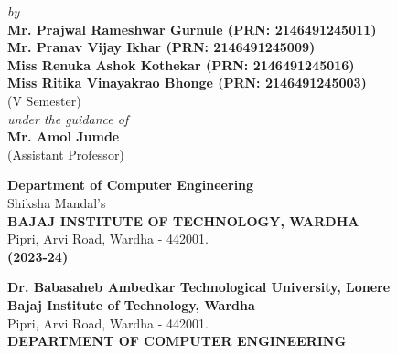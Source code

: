 \documentclass[a4paper, 12pt]{report}
\begin{document}
\begin{frontmatter}
\begin{titlepage}
\begin{center}
	\textit{by}\\[0.3cm]
	\textbf{Mr. Prajwal Rameshwar Gurnule (PRN: 2146491245011)}\\[0.25cm]
	\textbf{Mr. Pranav Vijay Ikhar (PRN: 2146491245009)}\\[0.25cm]
	\textbf{Miss Renuka Ashok Kothekar (PRN: 2146491245016)}\\[0.25cm]
	\textbf{Miss Ritika Vinayakrao Bhonge (PRN: 2146491245003)}\\[0.25cm]
	(V Semester)
	\\[0.5cm]	
	
	\textit{under the guidance of}\\[0.25cm]
	\textbf{Mr. Amol Jumde}\\[0.25cm]	
	(Assistant Professor)\\[0.5cm]
	\vspace{0.2cm}
	
	\textup{\textbf{\large Department of Computer Engineering}\\[0.1cm]
		Shiksha Mandal's\\
		[0.1cm]
		\textbf{BAJAJ INSTITUTE OF TECHNOLOGY, WARDHA}}\\[0.1cm]Pipri, Arvi Road, Wardha - 442001.\\[0.2cm]
	
	\textbf{(2023-24)}
\end{center}
\end{titlepage}

\begin{titlepage}
\begin{center}
	\textup{\large  \textbf{Dr. Babasaheb Ambedkar Technological University, Lonere}\\
	\textbf{Bajaj Institute of Technology, Wardha}}\\
	Pipri, Arvi Road, Wardha - 442001.\\[0.5cm]
	\textbf{\large DEPARTMENT OF COMPUTER ENGINEERING}
	

\end{center}
\end{titlepage}
\end{frontmatter}
\end{document}
